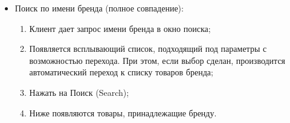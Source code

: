 {\begin{itogolong}
\begin{itemize}
\item	Поиск по имени бренда (полное совпадение):
 	\begin{enumerate} 
		\item	Клиент дает запрос имени бренда в окно поиска;
		\item	Появляется всплывающий список, подходящий под параметры с возможностью перехода. При этом, если выбор сделан, производится автоматический переход к списку товаров бренда;
		\item	Нажать на Поиск (Search);
		\item	Ниже появляются товары, принадлежащие бренду.
	\end{enumerate}	
\end{itemize}
\end{itogolong}
}



